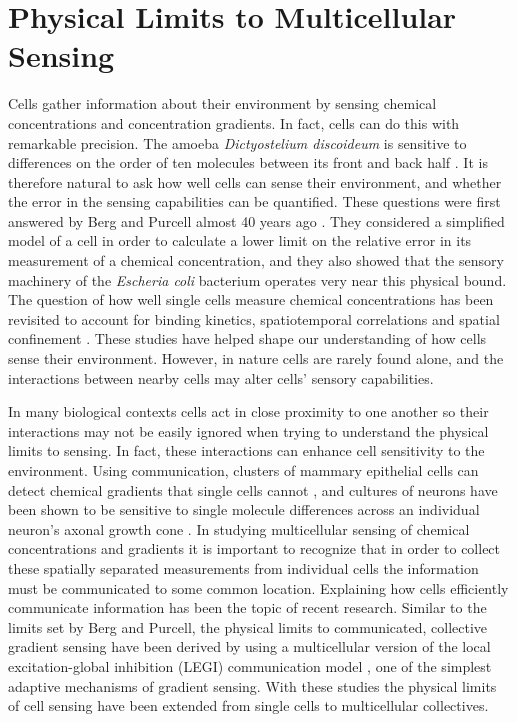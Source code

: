 
\chapter{Physical Limits to Multicellular Sensing}

Cells gather information about their environment by sensing chemical concentrations and concentration gradients. In fact, cells can do this with remarkable precision. The amoeba \textit{Dictyostelium discoideum} is sensitive to differences on the order of ten molecules between its front and back half \cite{song2006dictyostelium}. It is therefore natural to ask how well cells can sense their environment, and whether the error in the sensing capabilities can be quantified. These questions were first answered by Berg and Purcell almost 40 years ago \cite{berg1977physics}. They considered a simplified model of a cell in order to calculate a lower limit on the relative error in its measurement of a chemical concentration, and they also showed that the sensory machinery of the \textit{Escheria coli} bacterium operates very near this physical bound. The question of how well single cells measure chemical concentrations has been revisited to account for binding kinetics, spatiotemporal correlations and spatial confinement
\cite{bialek2005physical, kaizu2014berg, bicknell2015limits}.
These studies have helped shape our understanding of how cells sense their environment. However, in nature cells are rarely found alone, and the interactions between nearby cells may alter cells' sensory capabilities.

In many biological contexts cells act in close proximity to one another so their interactions may not be easily ignored when trying to understand the physical limits to sensing. In fact, these interactions can enhance cell sensitivity to the environment. Using communication, clusters of mammary epithelial cells can detect chemical gradients that single cells cannot \cite{ellison2016cell}, and cultures of neurons have been shown to be sensitive to single molecule differences across an individual neuron's axonal growth cone \cite{rosoff2004new}. In studying multicellular sensing of chemical concentrations and gradients it is important to recognize that in order to collect these spatially separated measurements from individual cells the information must be communicated to some common location. Explaining how cells efficiently communicate information has been the topic of recent research. Similar to the limits set by Berg and Purcell, the physical limits to communicated, collective gradient sensing have been derived \cite{mugler2016limits,ellison2016cell} by using a multicellular version of the local excitation-global inhibition (LEGI) communication model \cite{levchenko2002models}, one of the simplest adaptive mechanisms of gradient sensing. With these studies the physical limits of cell sensing have been extended from single cells to multicellular collectives.

